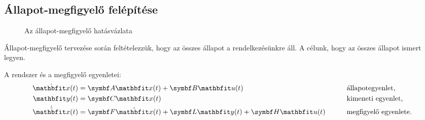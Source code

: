 \subsection{Állapot-megfigyelő felépítése}

\begin{figure}[htb]
  \centering
  
  \caption{Az állapot-megfigyelő hatásvázlata}
  \label{fig:state-observer}
\end{figure}

Állapot-megfigyelő tervezése során feltételezzük, hogy az összes állapot a
rendelkezésünkre áll. A célunk, hogy az összes állapot ismert legyen.

A rendszer és a megfigyelő egyenletei:
\begin{alignat}{9}
  \dot{\rvec x}(t) & = \rmat A \rvec x(t) + \rmat B \rvec u(t)
                   &
                   & \text{állapotegyenlet,}
  \\
  \rvec y(t)       & = \rmat C \rvec x(t)
                   &
                   & \text{kimeneti egyenlet,}
  \\
  \dot{\hvec x}(t) & = \rmat F \hvec x(t) + \rmat L \rvec y(t) + \rmat H \rvec u(t) \quad \quad
                   &
                   & \text{megfigyelő egyenlete.}
\end{alignat}

